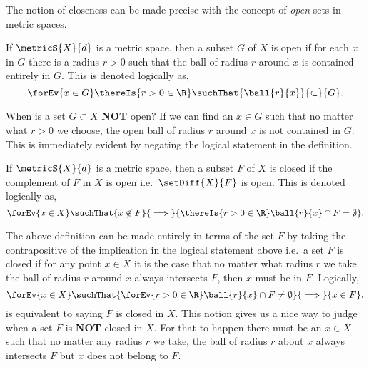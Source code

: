 The notion of closeness can be made precise with the concept of \emph{open} sets in metric spaces.
\begin{Definition}[name=Open set]
    If $\metricS{X}{d}$ is a metric space, then a subset $G$ of $X$ is open if for each $x$ in $G$ there is a
    radius $r > 0$ such that the ball of radius $r$ around $x$ is contained entirely in $G$. This is denoted
    logically as,
    \[\forEv{x\in G}\thereIs{r > 0 \in \R}\suchThat{\ball{r}{x}}{\subset}{G}.\]
\end{Definition}
When is a set $G \subset X$ \textbf{NOT} open? If we can find an $x \in G$ such that no matter what $r > 0$ we
choose, the open ball of radius $r$ around $x$ is not contained in $G$. This is immediately evident by
negating the logical statement in the definition.
\begin{Definition}[name=Closed set]
    If $\metricS{X}{d}$ is a metric space, then a subset $F$ of $X$ is closed if the complement of $F$ in $X$
    is open i.e.~$\setDiff{X}{F}$ is open. This is denoted logically as,
    \[\forEv{x\in X}\suchThat{x\not\in F}{\implies}{\thereIs{r > 0\in\R}\ball{r}{x}\cap F = \emptyset}.\]
\end{Definition}
The above definition can be made entirely in terms of the set $F$ by taking the contrapositive of the
implication in the logical statement above i.e.~a set $F$ is closed if for any point $x \in X$ it is
the case that no matter what radius $r$ we take the ball of radius $r$ around $x$ always intersects $F$, then
$x$ must be in $F$. Logically,
\[\forEv{x\in X}\suchThat{\forEv{r > 0 \in \R}\ball{r}{x}\cap F \neq \emptyset}{\implies}{x\in F},\]
is equivalent to saying $F$ is closed in $X$. This notion gives us a nice way to judge when a set $F$ is
\textbf{NOT}
closed in $X$. For that to happen there must be an $x \in X$ such that no matter any radius $r$ we take, the
ball of radius $r$ about $x$ always intersects $F$ but $x$ does not belong to $F$.
